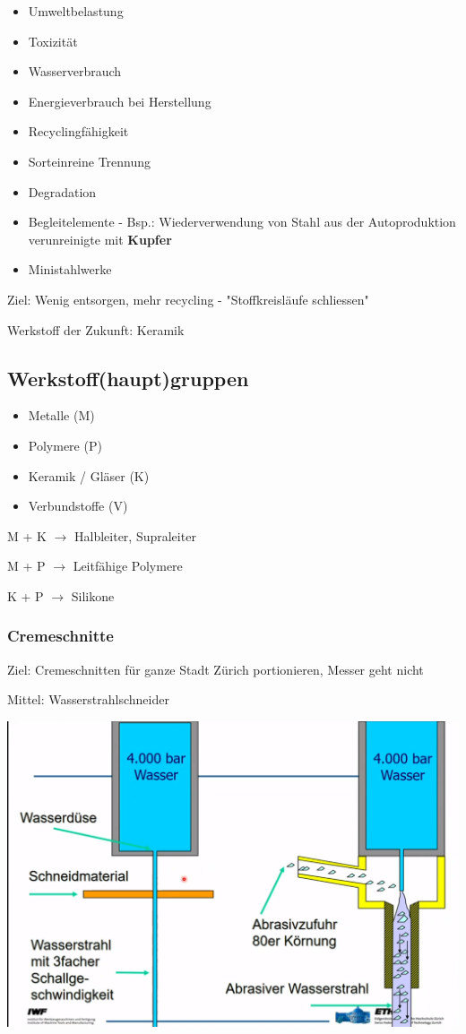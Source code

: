 \documentclass{article}
\begin{document}
\begin{itemize}
    \item Umweltbelastung
    \item Toxizität
    \item Wasserverbrauch
    \item Energieverbrauch bei Herstellung
    \item Recyclingfähigkeit 

    \item Sorteinreine Trennung
    \item Degradation
    \item Begleitelemente - Bsp.: Wiederverwendung von Stahl aus der Autoproduktion verunreinigte mit \textbf{Kupfer}
    \item Ministahlwerke
\end{itemize}

Ziel: Wenig entsorgen, mehr recycling - "Stoffkreisläufe schliessen"

Werkstoff der Zukunft: Keramik

\subsection{Werkstoff(haupt)gruppen}
\begin{itemize}
    \item Metalle (M)
    \item Polymere (P)
    \item Keramik / Gläser (K)
    \item Verbundstoffe (V)
\end{itemize}

M + K $\rightarrow$ Halbleiter, Supraleiter

M + P $\rightarrow$ Leitfähige Polymere

K + P $\rightarrow$ Silikone

\newpage

\subsubsection{Cremeschnitte}
Ziel: Cremeschnitten für ganze Stadt Zürich portionieren, Messer geht nicht

Mittel: Wasserstrahlschneider

\includegraphics[scale=0.25]{wasserstrahl-09-21}
\end{document}
